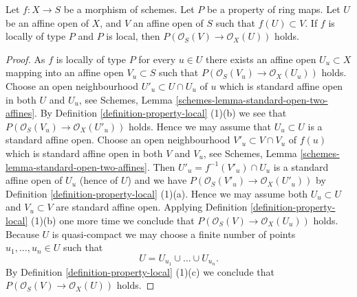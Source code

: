 \begin{lemma}
\label{lemma-locally-P}
Let $f : X \to S$ be a morphism of schemes.
Let $P$ be a property of ring maps.
Let $U$ be an affine open of $X$,
and $V$ an affine open of $S$ such that
$f(U) \subset V$.
If $f$ is locally of type $P$ and $P$ is local,
then $P(\mathcal{O}_S(V) \to \mathcal{O}_X(U))$ holds.
\end{lemma}

\begin{proof}
As $f$ is locally of type $P$ for every $u \in U$ there exists an
affine open $U_u \subset X$ mapping into an affine open $V_u \subset S$
such that $P(\mathcal{O}_S(V_u) \to \mathcal{O}_X(U_u))$ holds.
Choose an open neighbourhood $U'_u \subset U \cap U_u$ of $u$
which is standard affine open in both $U$ and $U_u$, see
Schemes, Lemma \ref{schemes-lemma-standard-open-two-affines}.
By Definition \ref{definition-property-local} (1)(b)
we see that $P(\mathcal{O}_S(V_u) \to \mathcal{O}_X(U'_u))$ holds.
Hence we may assume that $U_u \subset U$ is a standard affine open.
Choose an open neighbourhood $V'_u \subset V \cap V_u$
of $f(u)$ which is standard affine open in both $V$ and $V_u$, see
Schemes, Lemma \ref{schemes-lemma-standard-open-two-affines}.
Then $U'_u = f^{-1}(V'_u) \cap U_u$ is a standard affine open
of $U_u$ (hence of $U$) and we have
$P(\mathcal{O}_S(V'_u) \to \mathcal{O}_X(U'_u))$ by
Definition \ref{definition-property-local} (1)(a).
Hence we may assume both $U_u \subset U$ and $V_u \subset V$
are standard affine open. Applying
Definition \ref{definition-property-local} (1)(b)
one more time we conclude that $P(\mathcal{O}_S(V) \to \mathcal{O}_X(U_u))$
holds. Because $U$ is quasi-compact we may choose a finite number
of points $u_1, \ldots, u_n \in U$ such that
$$
U = U_{u_1} \cup \ldots \cup U_{u_n}.
$$
By Definition \ref{definition-property-local} (1)(c)
we conclude that $P(\mathcal{O}_S(V) \to \mathcal{O}_X(U))$ holds.
\end{proof}


